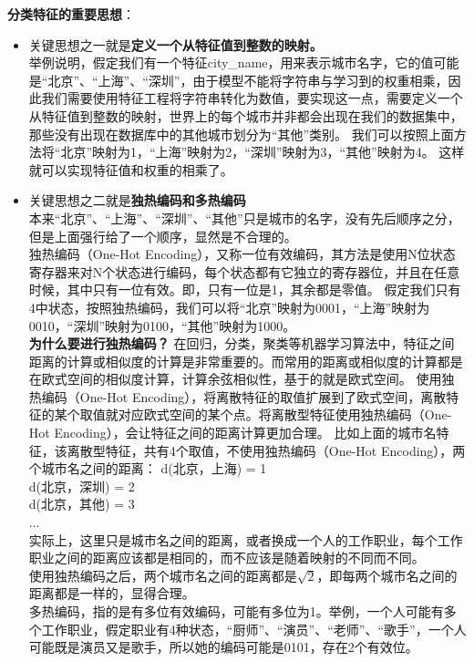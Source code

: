 \textbf{分类特征的重要思想}：
\begin{itemize}
	\item 关键思想之一就是\textbf{定义一个从特征值到整数的映射。}  \\
		举例说明，假定我们有一个特征city\_name，用来表示城市名字，它的值可能是“北京”、“上海”、“深圳”，由于模型不能将字符串与学习到的权重相乘，因此我们需要使用特征工程将字符串转化为数值，要实现这一点，需要定义一个从特征值到整数的映射，世界上的每个城市并非都会出现在我们的数据集中，那些没有出现在数据库中的其他城市划分为“其他”类别。
		我们可以按照上面方法将“北京”映射为1，“上海”映射为2，“深圳”映射为3，“其他”映射为4。
		这样就可以实现特征值和权重的相乘了。
	\item 关键思想之二就是\textbf{独热编码和多热编码} \\
	 	本来“北京”、“上海”、“深圳”、“其他”只是城市的名字，没有先后顺序之分，但是上面强行给了一个顺序，显然是不合理的。   \\
	 	独热编码（One-Hot Encoding），又称一位有效编码，其方法是使用N位状态寄存器来对N个状态进行编码，每个状态都有它独立的寄存器位，并且在任意时候，其中只有一位有效。即，只有一位是1，其余都是零值。
	 	假定我们只有4中状态，按照独热编码，我们可以将“北京”映射为0001，“上海”映射为0010，“深圳”映射为0100，“其他”映射为1000。     \\
	 	\textbf{为什么要进行独热编码？}
	 	在回归，分类，聚类等机器学习算法中，特征之间距离的计算或相似度的计算是非常重要的。而常用的距离或相似度的计算都是在欧式空间的相似度计算，计算余弦相似性，基于的就是欧式空间。
	 	使用独热编码（One-Hot Encoding），将离散特征的取值扩展到了欧式空间，离散特征的某个取值就对应欧式空间的某个点。将离散型特征使用独热编码（One-Hot Encoding），会让特征之间的距离计算更加合理。
	 	比如上面的城市名特征，该离散型特征，共有4个取值，不使用独热编码（One-Hot Encoding），两个城市名之间的距离：
	 	d(北京，上海) = 1 \\
	 	d(北京，深圳) = 2 \\
	 	d(北京，其他) = 3 \\
	 	$\hdots$  \\
	 	实际上，这里只是城市名之间的距离，或者换成一个人的工作职业，每个工作职业之间的距离应该都是相同的，而不应该是随着映射的不同而不同。\\
	 	使用独热编码之后，两个城市名之间的距离都是$\sqrt{2}$，即每两个城市名之间的距离都是一样的，显得合理。\\
	 	多热编码，指的是有多位有效编码，可能有多位为1。举例，一个人可能有多个工作职业，假定职业有4种状态，“厨师”、“演员”、“老师”、“歌手”，一个人可能既是演员又是歌手，所以她的编码可能是0101，存在2个有效位。
\end{itemize}

